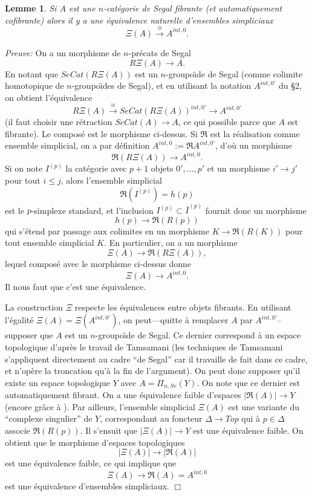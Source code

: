\documentclass[12pt]{article}
\newcommand{\eop}{\hfill $\Box$\vspace{.1in}}
\newtheorem{lemme}[lemma]{Lemme}
\begin{document}
\begin{lemme}
\label{sigma}
Si $A$ est une $n$-cat\'egorie de Segal fibrante (et automatiquement
cofibrante) alors il y a une \'equivalence naturelle d'ensembles simpliciaux
$$
\Xi (A) \stackrel{\cong}{\rightarrow} A^{int, 0}.
$$
\end{lemme}
{\em Preuve:}
On a un morphisme de $n$-pr\'ecats de Segal
$$
R\Xi (A) \rightarrow A.
$$
En notant que $SeCat(R\Xi (A))$ est un $n$-groupo\"{\i}de de Segal (comme
colimite homotopique de $n$-groupo\"{\i}des de Segal), et
en utilisant la notation $A^{int, 0'}$ du \S 2, on obtient l'\'equivalence
$$
R\Xi (A)\stackrel{\cong}{\rightarrow}
SeCat(R\Xi (A))^{int, 0'} \rightarrow A^{int, 0'}
$$
(il faut choisir une r\'etraction $SeCat(A)\rightarrow A$,
ce qui possible parce que $A$ est
fibrante). Le compos\'e est le morphisme ci-dessus. Si $\Re$ est la
r\'ealisation comme
ensemble simplicial, on a par d\'efinition $A^{int, 0}:= \Re A^{int, 0'}$,
d'o\`u un morphisme $$
\Re (R\Xi (A)) \rightarrow A^{int, 0}.
$$
Si on note $I^{(p)}$ la cat\'egorie avec $p+1$ objets $0',\ldots , p'$ et
un morphisme $i'\rightarrow j'$ pour tout $i\leq j$, alors
l'ensemble simplicial
$$
\Re (I^{(p)})= h(p)
$$
est le $p$-simplexe standard, et l'inclusion
$I^{(p)} \subset \overline{I}^{(p)}$ fournit donc un morphisme
$$
h(p)\rightarrow \Re (R(p))
$$
qui s'\'etend par passage aux
colimites en un morphisme $K\rightarrow \Re (R(K))$ pour tout
ensemble simplicial $K$. En particulier, on a un morphisme
$$
\Xi (A)\rightarrow \Re(R\Xi (A)),
$$
lequel compos\'e avec le morphisme ci-dessus donne
$$
\Xi (A)\rightarrow A^{int, 0}.
$$
Il nous faut que c'est une \'equivalence.

La construction $\Xi$ respecte les \'equivalences entre objets fibrants.
En utilisant l'\'egalit\'e $\Xi (A) = \Xi
(A^{int, 0'})$, on peut---quitte \`a remplacer $A$ par $A^{int, 0'}$--
supposer que $A$ est un $n$-groupo\"{\i}de de Segal. Ce
dernier correspond \`a un
espace topologique d'apr\`es le travail de
Tamsamani \cite{Tamsamani} (les techniques de Tamsamani
s'appliquent directement au cadre ``de Segal'' car il travaille de fait
dans ce cadre, et n'op\`ere la troncation qu'\`a la fin de l'argument).
On peut donc
supposer qu'il existe un espace
topologique $Y$ avec $A= \Pi _{n,Se}(Y)$. On note que ce dernier
est automatiquement fibrant. On a une \'equivalence faible d'espaces $|\Re
(A)|\rightarrow Y$ (encore gr\^ace \`a \cite{Tamsamani}).
Par ailleurs, l'ensemble simplicial
$\Xi (A)$ est une variante du ``complexe
singulier'' de $Y$, correspondant
au foncteur $\Delta \rightarrow Top$ qui \`a $p\in
\Delta$ associe $\Re (R(p))$. Il s'ensuit que $| \Xi (A)| \rightarrow Y$ est
une \'equivalence faible.  On obtient que le morphisme d'espaces
topologiques
$$
| \Xi (A)|\rightarrow |\Re (A)|
$$
est une \'equivalence faible, ce qui implique que
$$
\Xi (A)\rightarrow \Re (A) = A^{int, 0}
$$
est une \'equivalence d'ensembles simpliciaux.
\eop
\end{document}
